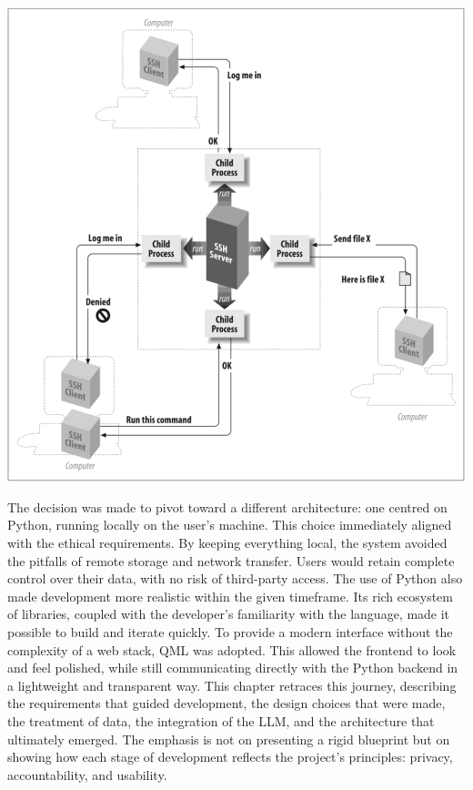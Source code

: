 \documentclass{report}
\begin{document}
\includegraphics[width=\textwidth]{png_files/SSH_Architecture.png}


The decision was made to pivot toward a different architecture: one centred on Python, running locally on the user's machine. 
This choice immediately aligned with the ethical requirements. 
By keeping everything local, the system avoided the pitfalls of remote storage and network transfer.
Users would retain complete control over their data, with no risk of third-party access. 
The use of Python also made development more realistic within the given timeframe. 
Its rich ecosystem of libraries, coupled with the developer's familiarity with the language, made it possible to build and iterate quickly. 
To provide a modern interface without the complexity of a web stack, QML was adopted. 
This allowed the frontend to look and feel polished, while still communicating directly with the Python backend in a lightweight and transparent way.
This chapter retraces this journey, describing the requirements that guided development, the design choices that were made, the treatment of data, the integration of the LLM, and the architecture that ultimately emerged. 
The emphasis is not on presenting a rigid blueprint but on showing how each stage of development reflects the project's principles: privacy, accountability, and usability.
\end{document}
